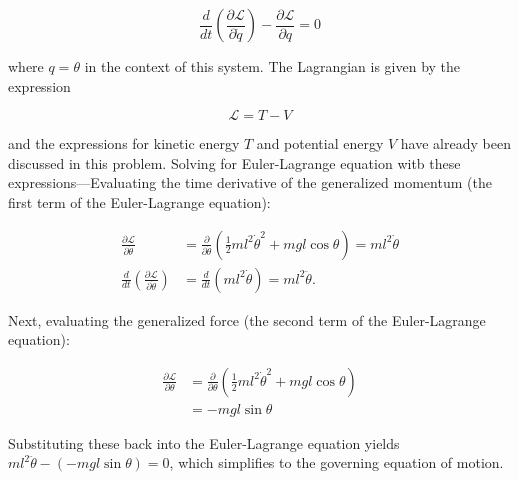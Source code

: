 \begin{equation}
    \frac{d}{dt} \left( \frac{\partial \mathcal{L}}{\partial \dot{q}} \right) - \frac{\partial \mathcal{L}}{\partial q} = 0
    \label{eq:Euler Lagrange Equation}
\end{equation}

where $q = \theta$ in the context of this system. The Lagrangian is given by the expression

\begin{equation}
    \mathcal{L} = T - V
\end{equation}

and the expressions for kinetic energy $T$ and potential energy $V$ have already been discussed in this problem. Solving for Euler-Lagrange equation witb these expressions---Evaluating the time derivative of the generalized momentum (the first term of the Euler-Lagrange equation):

\begin{align}
    \frac{\partial \mathcal{L}}{\partial \dot{\theta}} &= \frac{\partial}{\partial \dot{\theta}} \left( \frac{1}{2}ml^2\dot{\theta}^2 + mgl\cos\theta \right) = ml^2\dot{\theta} \nonumber \\
    \frac{d}{dt} \left( \frac{\partial \mathcal{L}}{\partial \dot{\theta}} \right) &= \frac{d}{dt} \left( ml^2\dot{\theta} \right) = ml^2\ddot{\theta}.
\end{align}

Next, evaluating the generalized force (the second term of the Euler-Lagrange equation):

\begin{align}
    \frac{\partial \mathcal{L}}{\partial \theta} &= \frac{\partial}{\partial \theta} \left( \frac{1}{2}ml^2\dot{\theta}^2 + mgl\cos\theta \right) \nonumber \\
    &= -mgl\sin\theta
\end{align}

Substituting these back into the Euler-Lagrange equation yields \(ml^2\ddot{\theta} - (-mgl\sin\theta) = 0\), which simplifies to the governing equation of motion.

